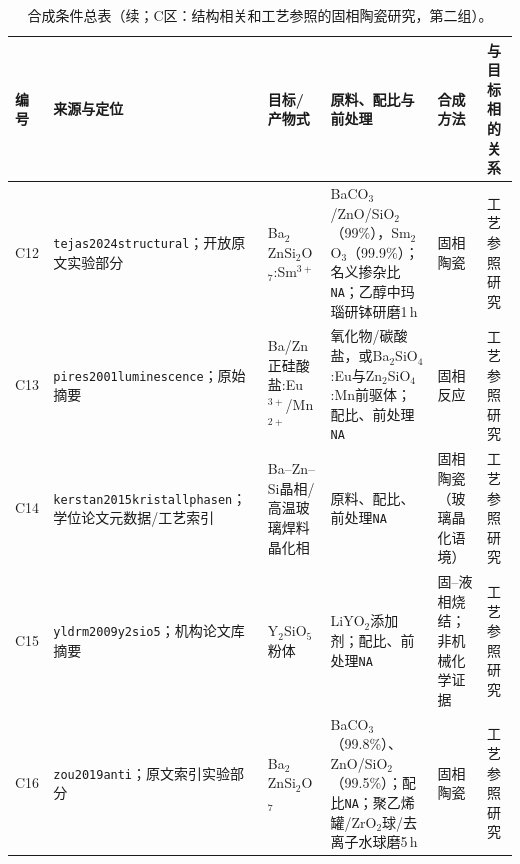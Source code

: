 \begin{table}[p]
\ContinuedFloat
\centering
\footnotesize
\setlength{\tabcolsep}{1.5pt}
\caption{合成条件总表（续；C区：结构相关和工艺参照的固相陶瓷研究，第二组）。}
\begin{tabular}{P{0.045\textwidth}P{0.19\textwidth}P{0.16\textwidth}P{0.27\textwidth}P{0.13\textwidth}P{0.10\textwidth}}
\toprule
编号 & 来源与定位 & 目标/产物式 & 原料、配比与前处理 & 合成方法 & 与目标相的关系\\
\midrule
C12 & \texttt{tejas2024structural}；开放原文实验部分\cite{tejas2024structural} & Ba$_2$ZnSi$_2$O$_7$:Sm$^{3+}$ & BaCO$_3$/ZnO/SiO$_2$（99\%），Sm$_2$O$_3$（99.9\%）；名义掺杂比\texttt{NA}；乙醇中玛瑙研钵研磨1\,h & 固相陶瓷 & 工艺参照研究\\
C13 & \texttt{pires2001luminescence}；原始摘要\cite{pires2001luminescence} & Ba/Zn正硅酸盐:Eu$^{3+}$/Mn$^{2+}$ & 氧化物/碳酸盐，或Ba$_2$SiO$_4$:Eu与Zn$_2$SiO$_4$:Mn前驱体；配比、前处理\texttt{NA} & 固相反应 & 工艺参照研究\\
C14 & \texttt{kerstan2015kristallphasen}；学位论文元数据/工艺索引\cite{kerstan2015kristallphasen} & Ba--Zn--Si晶相/高温玻璃焊料晶化相 & 原料、配比、前处理\texttt{NA} & 固相陶瓷（玻璃晶化语境） & 工艺参照研究\\
C15 & \texttt{yldrm2009y2sio5}；机构论文库摘要\cite{yldrm2009y2sio5} & Y$_2$SiO$_5$粉体 & LiYO$_2$添加剂；配比、前处理\texttt{NA} & 固--液相烧结；非机械化学证据 & 工艺参照研究\\
C16 & \texttt{zou2019anti}；原文索引实验部分\cite{zou2019anti} & Ba$_2$ZnSi$_2$O$_7$ & BaCO$_3$（99.8\%）、ZnO/SiO$_2$（99.5\%）；配比\texttt{NA}；聚乙烯罐/ZrO$_2$球/去离子水球磨5\,h & 固相陶瓷 & 工艺参照研究\\
\bottomrule
\end{tabular}


\end{table}
